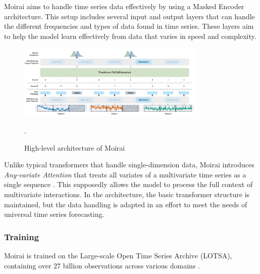 \documentclass[12pt,a4paper]{article}
\begin{document}
Moirai aims to handle time series data effectively by using a Masked Encoder architecture. This setup includes several input and output layers that can handle the different frequencies and types of data found in time series. These layers aim to help the model learn effectively from data that varies in speed and complexity.

\begin{figure}[htbp]
  \centering
  \includegraphics[width=0.8\textwidth]{moirari.png}
  \caption{High-level architecture of Moirai \parencite{woo2024unified}}.
  \label{moirari}
\end{figure}

Unlike typical transformers that handle single-dimension data, Moirai introduces \textit{Any-variate Attention} that treats all variates of a multivariate time series as a single sequence \parencite{woo2024unified}. This supposedly allows the model to process the full context of multivariate interactions. In the architecture, the basic transformer structure is maintained, but the data handling is adapted in an effort to meet the needs of universal time series forecasting.

\subsubsection{Training}

Moirai is trained on the Large-scale Open Time Series Archive (LOTSA), containing over 27 billion observations across various domains \parencite{woo2024unified}. 
\end{document}
